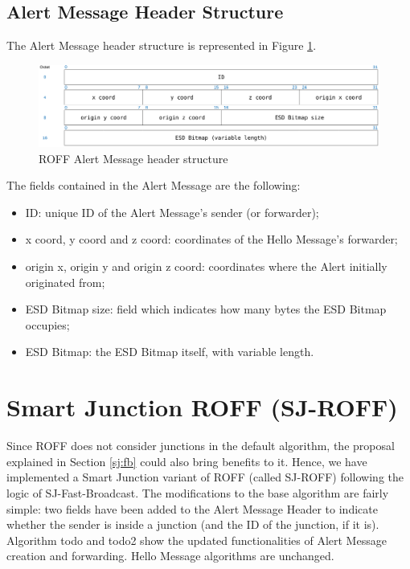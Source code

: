 		\subsection{Alert Message Header Structure}
			The Alert Message header structure is represented in Figure \ref{fig:roffAlertHeader}.
			
			\begin{figure}[H]
				\centering
				\includegraphics[width=\textwidth]{immagini/roffAlertHeader}
				\caption{ROFF Alert Message header structure}
				\label{fig:roffAlertHeader}
			\end{figure}
			
			The fields contained in the Alert Message are the following:
			\begin{itemize}
				\item ID: unique ID of the Alert Message's sender (or forwarder);
				\item x coord, y coord and z coord: coordinates of the Hello Message's forwarder;
				\item origin x, origin y and origin z coord: coordinates where the Alert initially originated from;
				\item ESD Bitmap size: field which indicates how many bytes the ESD Bitmap occupies;
				\item ESD Bitmap: the ESD Bitmap itself, with variable length.
			\end{itemize}
	
	\section{Smart Junction ROFF (SJ-ROFF)}
		Since ROFF does not consider junctions in the default algorithm, the proposal explained in Section \ref{sj:fb} could also bring benefits to it. Hence, we have implemented a Smart Junction variant of ROFF (called SJ-ROFF) following the logic of SJ-Fast-Broadcast. The modifications to the base algorithm are fairly simple: two fields have been added to the Alert Message Header to indicate whether the sender is inside a junction (and the ID of the junction, if it is). Algorithm todo and todo2 show the updated functionalities of Alert Message creation and forwarding. Hello Message algorithms are unchanged.
		
